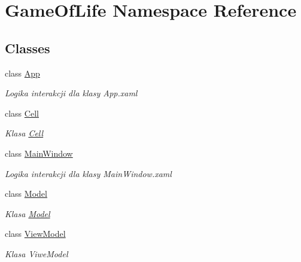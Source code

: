 \hypertarget{namespace_game_of_life}{}\section{Game\+Of\+Life Namespace Reference}
\label{namespace_game_of_life}
\subsection*{Classes}
\begin{DoxyCompactItemize}
\item 
class \mbox{\hyperlink{class_game_of_life_1_1_app}{App}}
\begin{DoxyCompactList}\small\item\em Logika interakcji dla klasy App.\+xaml \end{DoxyCompactList}\item 
class \mbox{\hyperlink{class_game_of_life_1_1_cell}{Cell}}
\begin{DoxyCompactList}\small\item\em Klasa \mbox{\hyperlink{class_game_of_life_1_1_cell}{Cell}} \end{DoxyCompactList}\item 
class \mbox{\hyperlink{class_game_of_life_1_1_main_window}{Main\+Window}}
\begin{DoxyCompactList}\small\item\em Logika interakcji dla klasy Main\+Window.\+xaml \end{DoxyCompactList}\item 
class \mbox{\hyperlink{class_game_of_life_1_1_model}{Model}}
\begin{DoxyCompactList}\small\item\em Klasa \mbox{\hyperlink{class_game_of_life_1_1_model}{Model}} \end{DoxyCompactList}\item 
class \mbox{\hyperlink{class_game_of_life_1_1_view_model}{View\+Model}}
\begin{DoxyCompactList}\small\item\em Klasa Viwe\+Model \end{DoxyCompactList}\end{DoxyCompactItemize}
